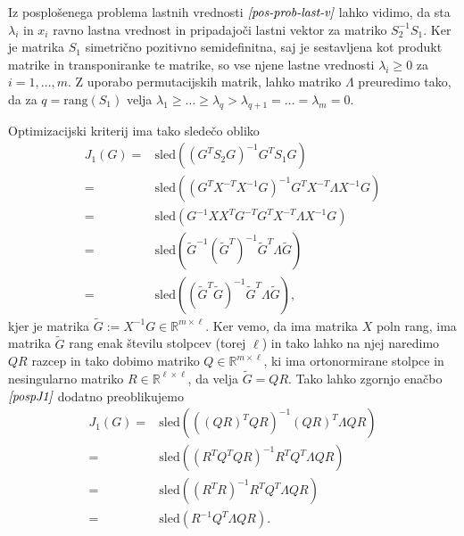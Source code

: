 \documentclass[mat1]{article}
\theoremstyle{definition}
\begin{document}
Iz posplošenega problema lastnih vrednosti $\textit{\eqref{pos-prob-last-v}}$ lahko vidimo, da sta $\lambda_i$ in $x_i$ ravno lastna vrednost in pripadajoči lastni vektor za matriko $S_2^{-1} S_1$. Ker je matrika $S_1$ simetrično pozitivno semidefinitna, saj je sestavljena kot produkt matrike in transponiranke te matrike, so vse njene lastne vrednosti $\lambda_i \geq 0$ za $i = 1, \ldots, m$. Z uporabo permutacijskih matrik, lahko matriko $\Lambda$ preuredimo tako, da za  $q = \text{rang} \left( S_1 \right)$ velja $\lambda_1 \geq \ldots \geq \lambda_q > \lambda_{q+1} = \ldots = \lambda_m = 0$.

Optimizacijski kriterij ima tako sledečo obliko
\begin{equation} \label{pospJ1}
\begin{split}
J_1\left(G\right)
=&
\text{sled} \left( (G^T S_2 G)^{-1} G^T S_1 G \right)
\\
=&
\text{sled} \left( (G^T X^{-T}X^{-1} G)^{-1} G^T X^{-T} \Lambda X^{-1} G \right)
\\
=&
\text{sled} \left( G^{-1} X X^{T} G^{-T} G^T X^{-T} \Lambda X^{-1} G \right)
\\
=&
\text{sled} \left( \tilde{G}^{-1} (\tilde{G}^T)^{-1} \tilde{G}^T \Lambda \tilde{G} \right)
\\
= &
\text{sled} \left( (\tilde{G}^T \tilde{G})^{-1} \tilde{G}^T \Lambda \tilde{G} \right)
\text{,} 
\end{split}
\end{equation}
kjer je matrika $\tilde{G} := X^{-1} G \in \mathbb{R}^{m \times \ell}$. Ker vemo, da ima matrika $X$ poln rang, ima matrika $\tilde{G}$ rang enak številu stolpcev (torej $\ell$) in tako lahko na njej naredimo $QR$ razcep in tako dobimo matriko $Q \in \mathbb{R}^{m \times \ell}$, ki ima ortonormirane stolpce in nesingularno matriko $R \in \mathbb{R}^{\ell \times \ell}$, da velja $\tilde{G} = QR$. Tako lahko zgornjo enačbo $\textit{\eqref{pospJ1}}$ dodatno preoblikujemo
\begin{equation}
\begin{split}
J_1(G)
=&
\text{sled} \left( ((QR)^T QR)^{-1} (QR)^T \Lambda QR \right)
\\
=&
\text{sled} \left( (R^T Q^T QR)^{-1} R^T Q^T \Lambda QR \right)
\\
=&
\text{sled} \left( (R^T R)^{-1} R^T Q^T \Lambda QR \right)
\nonumber \\
=&
\text{sled} \left( R^{-1} Q^T \Lambda QR \right)
\text{.}
\end{split}
\end{equation}
\end{document}
